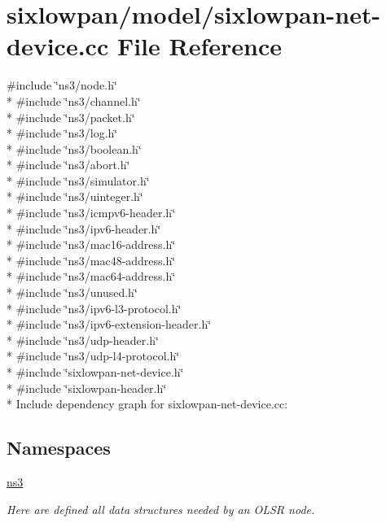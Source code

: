 \hypertarget{sixlowpan-net-device_8cc}{}\section{sixlowpan/model/sixlowpan-\/net-\/device.cc File Reference}
\label{sixlowpan-net-device_8cc}
{\ttfamily \#include \char`\"{}ns3/node.\+h\char`\"{}}\\*
{\ttfamily \#include \char`\"{}ns3/channel.\+h\char`\"{}}\\*
{\ttfamily \#include \char`\"{}ns3/packet.\+h\char`\"{}}\\*
{\ttfamily \#include \char`\"{}ns3/log.\+h\char`\"{}}\\*
{\ttfamily \#include \char`\"{}ns3/boolean.\+h\char`\"{}}\\*
{\ttfamily \#include \char`\"{}ns3/abort.\+h\char`\"{}}\\*
{\ttfamily \#include \char`\"{}ns3/simulator.\+h\char`\"{}}\\*
{\ttfamily \#include \char`\"{}ns3/uinteger.\+h\char`\"{}}\\*
{\ttfamily \#include \char`\"{}ns3/icmpv6-\/header.\+h\char`\"{}}\\*
{\ttfamily \#include \char`\"{}ns3/ipv6-\/header.\+h\char`\"{}}\\*
{\ttfamily \#include \char`\"{}ns3/mac16-\/address.\+h\char`\"{}}\\*
{\ttfamily \#include \char`\"{}ns3/mac48-\/address.\+h\char`\"{}}\\*
{\ttfamily \#include \char`\"{}ns3/mac64-\/address.\+h\char`\"{}}\\*
{\ttfamily \#include \char`\"{}ns3/unused.\+h\char`\"{}}\\*
{\ttfamily \#include \char`\"{}ns3/ipv6-\/l3-\/protocol.\+h\char`\"{}}\\*
{\ttfamily \#include \char`\"{}ns3/ipv6-\/extension-\/header.\+h\char`\"{}}\\*
{\ttfamily \#include \char`\"{}ns3/udp-\/header.\+h\char`\"{}}\\*
{\ttfamily \#include \char`\"{}ns3/udp-\/l4-\/protocol.\+h\char`\"{}}\\*
{\ttfamily \#include \char`\"{}sixlowpan-\/net-\/device.\+h\char`\"{}}\\*
{\ttfamily \#include \char`\"{}sixlowpan-\/header.\+h\char`\"{}}\\*
Include dependency graph for sixlowpan-\/net-\/device.cc\+:
\subsection*{Namespaces}
\begin{DoxyCompactItemize}
\item 
 \hyperlink{namespacens3}{ns3}
\begin{DoxyCompactList}\small\item\em Here are defined all data structures needed by an O\+L\+SR node. \end{DoxyCompactList}\end{DoxyCompactItemize}
